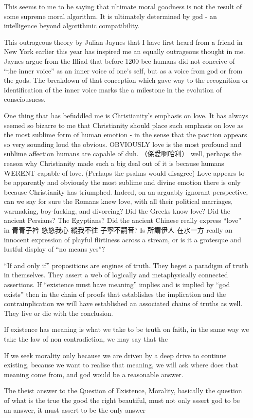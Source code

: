 This seems to me to be saying that ultimate moral goodness is not the result of some supreme moral algorithm. It is ultimately determined by god - an intelligence beyond algorithmic compatibility. 



This outrageous theory by Julian Jaynes that I have first heard from a friend in New York earlier this year has inspired me an equally outrageous thought in me. Jaynes argue from the Illiad that before 1200 bce humans did not conceive of “the inner voice” as an inner voice of one’s self, but as a voice from god or from the gods. The breakdown of that conception which gave way to the recognition or identification of the inner voice marks the a milestone in the evolution of consciousness. 

One thing that has befuddled me is Christianity’s emphasis on love. It has always seemed so bizarre to me that Christianity should place such emphasis on love as the most sublime form of human emotion - in the sense that the position appears so very sounding loud the obvious. OBVIOUSLY love is the most profound and sublime affection humans are capable of duh. （係愛啊哈利） well, perhaps the reason why Christianity made such a big deal out of it is because humans WERENT capable of love. (Perhaps the psalms would disagree) Love appears to be apparently and obviously the most sublime and divine emotion there is only because Christianity has triumphed. Indeed, on an arguably ignorant perspective, can we say for sure the Romans knew love, with all their political marriages, warmaking, boy-fucking, and divorcing? Did the Greeks know love? Did the ancient Persians? The Egyptians? Did the ancient Chinese really express “love” in 青青子衿 悠悠我心 縱我不往 子寧不嗣音? Is 所謂伊人 在水一方 really an innocent expression of playful flirtiness across a stream, or is it a grotesque and lustful display of “no means yes”? 



“If and only if” propositions are engines of truth. They beget a paradigm of truth in themselves. They assert a web of logically and metaphysically connected assertions. If “existence must have meaning” implies and is implied by “god exists” then in the chain of proofs that establishes the implication and the contrainplication we will have established an associated chains of truths as well. They live or die with the conclusion. 

If existence has meaning is what we take to be truth on faith, in the same way we take the law of non contradiction, we may say that the

If we seek morality only because we are driven by a deep drive to continue existing, because we want to realise that meaning, we will ask where does that meaning come from, and god would be a reasonable answer. 


The theist answer to the Question of Existence, Morality, basically the question of what is the true the good the right beautiful, must not only sssert god to be an answer, it must assert to be the only answer 

